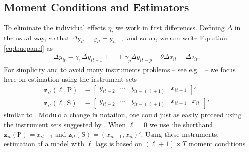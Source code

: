 \subsection{Moment Conditions and Estimators}
To eliminate the individual effects $\eta_i$ we work in first differences.
Defining $\Delta$ in the usual way, so that $\Delta y_{it} = y_{it} - y_{it-1}$ and so on, we can write Equation \ref{eq:truepanel} as
\begin{align}
  \Delta y_{it} = \gamma_1 \Delta y_{it-1} + \cdots + \gamma_p \Delta y_{it-p} + \theta \Delta x_{it} + \Delta v_{it}.
  \label{eq:truepaneldiff}
\end{align}
For simplicity and to avoid many instruments problems -- see e.g.\ \cite{Roodman} -- we focus here on estimation using the instrument sets
\begin{align}
  \mathbf{z}_{it}(\ell,\text{P}) &\equiv \left[
  \begin{array}{cccc}
    y_{it-2} & \cdots & y_{it-(\ell + 1)} & x_{it-1}
  \end{array}
\right]'
  \label{eq:ZdpanelP}
\\
\mathbf{z}_{it}(\ell, \text{S}) &\equiv \left[
\begin{array}{ccccc}
  y_{it-2} & \cdots & y_{it-(\ell + 1)} & x_{it-1} & x_{it}
\end{array}
\right]'
  \label{eq:ZdpanelS}
\end{align}
similar to \cite{AndersonHsiao}.
Modulo a change in notation, one could just as easily proceed using the instrument sets suggested by \cite{ArellanoBond}.
When $\ell = 0$ we use the shorthand $\mathbf{z}_{it}(\text{P}) = x_{it-1}$ and $\mathbf{z}_{it}(\text{S}) = (x_{it-1}, x_{it})'$.
Using these instruments, estimation of a model with $\ell$ lags is based on $(\ell + 1)\times T$ moment conditions
